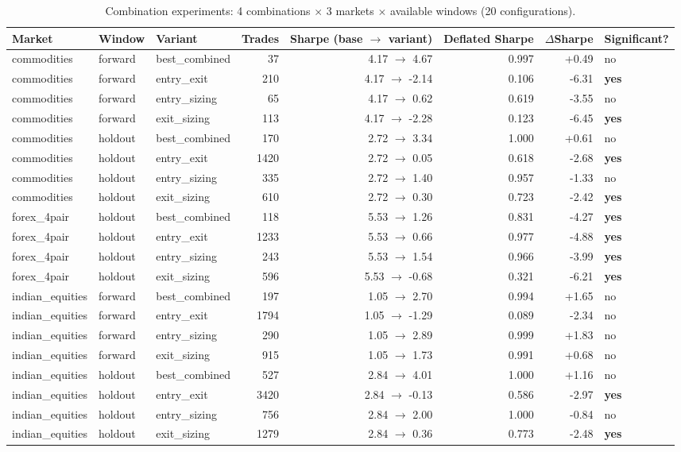 \begin{longtable}{l l l r r r r l}
\caption{Combination experiments: 4 combinations $\times$ 3 markets $\times$ available windows (20 configurations).} \label{tab:combinations} \\
\toprule
Market & Window & Variant & Trades & Sharpe (base $\to$ variant) & Deflated Sharpe & $\Delta$Sharpe & Significant? \\
\midrule
\endhead
\bottomrule
\endfoot
commodities & forward & best\_combined & 37 & 4.17 $\to$ 4.67 & 0.997 & +0.49 & no \\
commodities & forward & entry\_exit & 210 & 4.17 $\to$ -2.14 & 0.106 & -6.31 & \textbf{yes} \\
commodities & forward & entry\_sizing & 65 & 4.17 $\to$ 0.62 & 0.619 & -3.55 & no \\
commodities & forward & exit\_sizing & 113 & 4.17 $\to$ -2.28 & 0.123 & -6.45 & \textbf{yes} \\
commodities & holdout & best\_combined & 170 & 2.72 $\to$ 3.34 & 1.000 & +0.61 & no \\
commodities & holdout & entry\_exit & 1420 & 2.72 $\to$ 0.05 & 0.618 & -2.68 & \textbf{yes} \\
commodities & holdout & entry\_sizing & 335 & 2.72 $\to$ 1.40 & 0.957 & -1.33 & no \\
commodities & holdout & exit\_sizing & 610 & 2.72 $\to$ 0.30 & 0.723 & -2.42 & \textbf{yes} \\
forex\_4pair & holdout & best\_combined & 118 & 5.53 $\to$ 1.26 & 0.831 & -4.27 & \textbf{yes} \\
forex\_4pair & holdout & entry\_exit & 1233 & 5.53 $\to$ 0.66 & 0.977 & -4.88 & \textbf{yes} \\
forex\_4pair & holdout & entry\_sizing & 243 & 5.53 $\to$ 1.54 & 0.966 & -3.99 & \textbf{yes} \\
forex\_4pair & holdout & exit\_sizing & 596 & 5.53 $\to$ -0.68 & 0.321 & -6.21 & \textbf{yes} \\
indian\_equities & forward & best\_combined & 197 & 1.05 $\to$ 2.70 & 0.994 & +1.65 & no \\
indian\_equities & forward & entry\_exit & 1794 & 1.05 $\to$ -1.29 & 0.089 & -2.34 & no \\
indian\_equities & forward & entry\_sizing & 290 & 1.05 $\to$ 2.89 & 0.999 & +1.83 & no \\
indian\_equities & forward & exit\_sizing & 915 & 1.05 $\to$ 1.73 & 0.991 & +0.68 & no \\
indian\_equities & holdout & best\_combined & 527 & 2.84 $\to$ 4.01 & 1.000 & +1.16 & no \\
indian\_equities & holdout & entry\_exit & 3420 & 2.84 $\to$ -0.13 & 0.586 & -2.97 & \textbf{yes} \\
indian\_equities & holdout & entry\_sizing & 756 & 2.84 $\to$ 2.00 & 1.000 & -0.84 & no \\
indian\_equities & holdout & exit\_sizing & 1279 & 2.84 $\to$ 0.36 & 0.773 & -2.48 & \textbf{yes} \\
\end{longtable}
